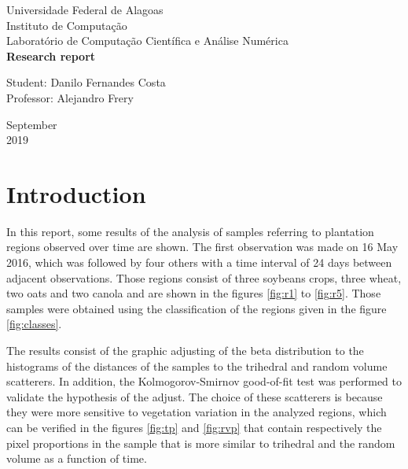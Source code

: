 \documentclass[12pt]{article}
\begin{document}

\onehalfspacing

\begin{titlepage}
\begin{center}

\Huge{Universidade Federal de Alagoas}\\
\large{Instituto de Computação}\\ 
\large{Laboratório de Computação Científica e Análise Numérica}\\ 
\vspace{220pt}
\textbf{\LARGE{Research report}}\\
\vspace{3,5cm}
\end{center}

\begin{flushleft}
\begin{tabbing}
Student: Danilo Fernandes Costa\\
Professor: Alejandro Frery\\
\end{tabbing}
\end{flushleft}
\vspace{1cm}

\begin{center}
\vspace{\fill}
September\\
2019
\end{center}
\end{titlepage}

\section{Introduction}

In this report, some results of the analysis of samples referring to plantation regions observed over time are shown. The first observation was made on 16 May 2016, which was followed by four others with a time interval of 24 days between adjacent observations. 
Those regions consist of three soybeans crops, three wheat, two oats and two canola and are shown in the figures \ref{fig:r1} to \ref{fig:r5}. Those samples were obtained using the classification of the regions given in the figure \ref{fig:classes}.

The results consist of the graphic adjusting of the beta distribution to the histograms of the distances of the samples to the trihedral and random volume scatterers. In addition, the Kolmogorov-Smirnov good-of-fit test was performed to validate the hypothesis of the adjust. The choice of these scatterers is because they were more sensitive to vegetation variation in the analyzed regions, which can be verified in the figures \ref{fig:tp} and \ref{fig:rvp} that contain respectively the pixel proportions in the sample that is more similar to trihedral and the random volume as a function of time.
\end{document}
